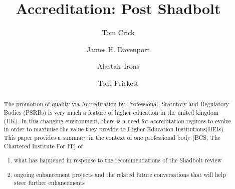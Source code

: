 \documentclass[sigconf]{acmart}
\begin{document}
\title{Accreditation: Post Shadbolt}




\author{Tom Crick}


\author{James H. Davenport}

\author{Alastair Irons}

\author{Tom Prickett}


\renewcommand{\shortauthors}{Crick, Davenport,  Irons, and Prickett.}

\begin{abstract}
The promotion of quality via Accreditation by Professional, Statutory and Regulatory Bodies (PSRBs) is very much a feature of higher education in the united kingdom (UK).  In this changing  environment, there is a need for accreditation regimes to evolve in order to maximise the value they provide to Higher Education Institutions(HEIs).  This paper provides a summary in the context of one professional body (BCS, The Chartered Institute For IT) of 
\begin{enumerate}
\item what has happened in response to the recommendations of the Shadbolt review \cite{shadbolt2016shadbolt}
\item ongoing enhancement projects and the related future conversations that will help steer further enhancements
\end{enumerate}
\end{abstract}
\end{document}
